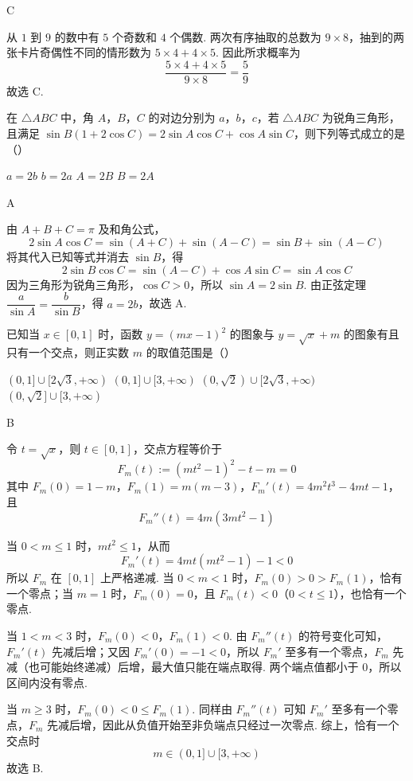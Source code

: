 \begin{answer}
C
\end{answer}

\begin{solution}
从 \(1\) 到 \(9\) 的数中有 \(5\) 个奇数和 \(4\) 个偶数. 两次有序抽取的总数为 \(9\times8\)，抽到的两张卡片奇偶性不同的情形数为 \(5\times4+4\times5\). 因此所求概率为
\[
\frac{5\times4+4\times5}{9\times8}=\frac59
\]
故选 C.
\end{solution}

\begin{problem}
在 \(\triangle ABC\) 中，角 \(A\)，\(B\)，\(C\) 的对边分别为 \(a\)，\(b\)，\(c\)，若 \(\triangle ABC\) 为锐角三角形，且满足 \(\sin B(1+2\cos C)=2\sin A\cos C+\cos A\sin C\)，则下列等式成立的是（\quad）

\choices
    {\(a=2b\)}
    {\(b=2a\)}
    {\(A=2B\)}
    {\(B=2A\)}
\end{problem}

\begin{answer}
A
\end{answer}

\begin{solution}
由 \(A+B+C=\pi\) 及和角公式，
\[
2\sin A\cos C=\sin(A+C)+\sin(A-C)=\sin B+\sin(A-C)
\]
将其代入已知等式并消去 \(\sin B\)，得
\[
2\sin B\cos C=\sin(A-C)+\cos A\sin C=\sin A\cos C
\]
因为三角形为锐角三角形，\(\cos C>0\)，所以 \(\sin A=2\sin B\). 由正弦定理 \(\dfrac a{\sin A}=\dfrac b{\sin B}\)，得 \(a=2b\)，故选 A.
\end{solution}

\begin{problem}
已知当 \(x\in[0,1]\) 时，函数 \(y=(mx-1)^2\) 的图象与 \(y=\sqrt{x}+m\) 的图象有且只有一个交点，则正实数 \(m\) 的取值范围是（\quad）

\choices
    {\((0,1]\cup[2\sqrt3,+\infty)\)}
    {\((0,1]\cup[3,+\infty)\)}
    {\((0,\sqrt2)\cup[2\sqrt3,+\infty)\)}
    {\((0,\sqrt2]\cup[3,+\infty)\)}
\end{problem}

\begin{answer}
B
\end{answer}

\begin{solution}
令 \(t=\sqrt x\)，则 \(t\in[0,1]\)，交点方程等价于
\[
F_m(t):=(mt^2-1)^2-t-m=0
\]
其中
\(F_m(0)=1-m\)，\(F_m(1)=m(m-3)\)，\(F_m'(t)=4m^2t^3-4mt-1\)，
且
\[
F_m''(t)=4m(3mt^2-1)
\]

当 \(0<m\leq1\) 时，\(mt^2\leq1\)，从而
\[
F_m'(t)=4mt(mt^2-1)-1<0
\]
所以 \(F_m\) 在 \([0,1]\) 上严格递减. 当 \(0<m<1\) 时，\(F_m(0)>0>F_m(1)\)，恰有一个零点；当 \(m=1\) 时，\(F_m(0)=0\)，且 \(F_m(t)<0\)（\(0<t\leq1\)），也恰有一个零点.

当 \(1<m<3\) 时，\(F_m(0)<0\)，\(F_m(1)<0\). 由 \(F_m''(t)\) 的符号变化可知，\(F_m'(t)\) 先减后增；又因 \(F_m'(0)=-1<0\)，所以 \(F_m'\) 至多有一个零点，\(F_m\) 先减（也可能始终递减）后增，最大值只能在端点取得. 两个端点值都小于 \(0\)，所以区间内没有零点.

当 \(m\geq3\) 时，\(F_m(0)<0\leq F_m(1)\). 同样由 \(F_m''(t)\) 可知 \(F_m'\) 至多有一个零点，\(F_m\) 先减后增，因此从负值开始至非负端点只经过一次零点. 综上，恰有一个交点时
\[
m\in(0,1]\cup[3,+\infty)
\]
故选 B.
\end{solution}

